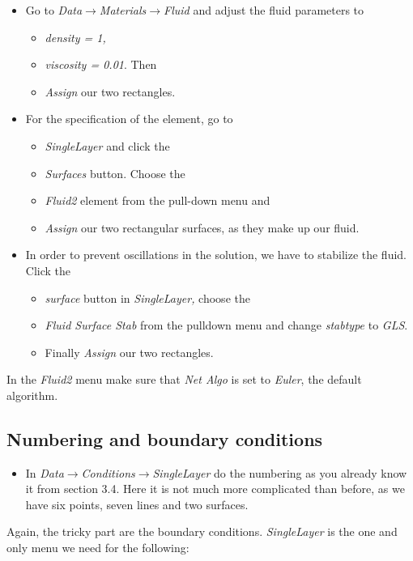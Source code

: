 \begin{itemize}
\item Go to \emph{Data$\to$Materials$\to$Fluid} and adjust the fluid parameters
to

\begin{itemize}
\item \emph{density = 1, }
\item \emph{viscosity = 0.01}. Then
\item \emph{Assign} our two rectangles.
\end{itemize}
\item For the specification of the element, go to

\begin{itemize}
\item \emph{SingleLayer} and click the
\item \emph{Surfaces} button. Choose the
\item \emph{Fluid2} element from the pull-down menu and
\item \emph{Assign} our two rectangular surfaces, as they make up our fluid.
\end{itemize}
\item In order to prevent oscillations in the solution, we have to stabilize
the fluid. Click the

\begin{itemize}
\item \emph{surface} button in \emph{SingleLayer,} choose the
\item \emph{Fluid Surface Stab} from the pulldown menu and change \emph{stabtype} to  \emph{GLS}.
\item Finally \emph{Assign} our two rectangles.
\end{itemize}
\end{itemize}
In the \emph{Fluid2} menu make sure that \emph{Net Algo} is set to
\emph{Euler}, the default algorithm.


\subsection{Numbering and boundary conditions}

\begin{itemize}
\item In \emph{Data$\to$Conditions$\to$SingleLayer} do the numbering as
you already know it from section 3.4. Here it is not much more complicated
than before, as we have six points, seven lines and two surfaces.
\end{itemize}
Again, the tricky part are the boundary conditions. \emph{SingleLayer}
is the one and only menu we need for the following:

